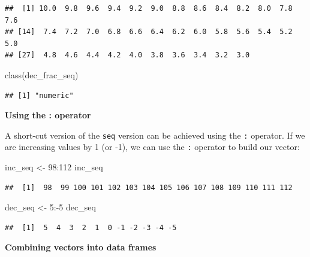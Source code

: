 \documentclass[]{tufte-book}
\newenvironment{Shaded}{\begin{snugshade}}{\end{snugshade}}
\newcommand{\DecValTok}[1]{\textcolor[rgb]{0.00,0.00,0.81}{#1}}
\newcommand{\FunctionTok}[1]{\textcolor[rgb]{0.00,0.00,0.00}{#1}}
\newcommand{\NormalTok}[1]{#1}
\newcommand{\OtherTok}[1]{\textcolor[rgb]{0.56,0.35,0.01}{#1}}
\newcommand{\SpecialCharTok}[1]{\textcolor[rgb]{0.00,0.00,0.00}{#1}}
\begin{document}
\begin{verbatim}
##  [1] 10.0  9.8  9.6  9.4  9.2  9.0  8.8  8.6  8.4  8.2  8.0  7.8  7.6
## [14]  7.4  7.2  7.0  6.8  6.6  6.4  6.2  6.0  5.8  5.6  5.4  5.2  5.0
## [27]  4.8  4.6  4.4  4.2  4.0  3.8  3.6  3.4  3.2  3.0
\end{verbatim}

\begin{Shaded}
\begin{Highlighting}[]
\FunctionTok{class}\NormalTok{(dec\_frac\_seq)}
\end{Highlighting}
\end{Shaded}

\begin{verbatim}
## [1] "numeric"
\end{verbatim}

\vspace*{0.2in}

\noindent\textbf{Using the : operator}\vspace*{0.1in}

A short-cut version of the \texttt{seq} version can be achieved using the \texttt{:} operator. If we are increasing values by 1 (or -1), we can use the \texttt{:} operator to build our vector:

\begin{Shaded}
\begin{Highlighting}[]
\NormalTok{inc\_seq }\OtherTok{\textless{}{-}} \DecValTok{98}\SpecialCharTok{:}\DecValTok{112}
\NormalTok{inc\_seq}
\end{Highlighting}
\end{Shaded}

\begin{verbatim}
##  [1]  98  99 100 101 102 103 104 105 106 107 108 109 110 111 112
\end{verbatim}

\begin{Shaded}
\begin{Highlighting}[]
\NormalTok{dec\_seq }\OtherTok{\textless{}{-}} \DecValTok{5}\SpecialCharTok{:{-}}\DecValTok{5}
\NormalTok{dec\_seq}
\end{Highlighting}
\end{Shaded}

\begin{verbatim}
##  [1]  5  4  3  2  1  0 -1 -2 -3 -4 -5
\end{verbatim}

\vspace*{0.2in}

\noindent\textbf{Combining vectors into data frames}\vspace*{0.1in}
\end{document}
